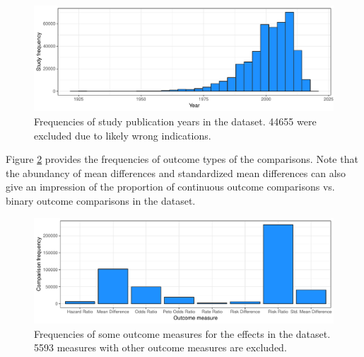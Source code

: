 \documentclass[11pt,a4paper,twoside]{book}\usepackage[]{graphicx}\usepackage[]{color}
\newenvironment{knitrout}{}{} %
\begin{document}
\begin{figure}
\begin{knitrout}
\color{fgcolor}

{\centering \includegraphics[width=\textwidth-3cm]{figure/ch02_figunnamed-chunk-8-1} 

}



\end{knitrout}
\caption{Frequencies of study publication years in the dataset. 44655 were excluded due to likely wrong indications.}
\label{study.years}
\end{figure}

Figure \ref{study.outcomes} provides the frequencies of outcome types of the comparisons. Note that the abundancy of mean differences and standardized mean differences can also give an impression of the proportion of continuous outcome comparisons vs. binary outcome comparisons in the dataset.

\begin{figure}
\begin{knitrout}
\color{fgcolor}

{\centering \includegraphics[width=\textwidth-3cm]{figure/ch02_figunnamed-chunk-9-1} 

}



\end{knitrout}
\caption{Frequencies of some outcome measures for the effects in the dataset. 5593 measures with other outcome measures are excluded.}
\label{study.outcomes}
\end{figure}
\end{document}
